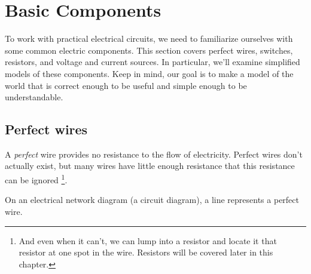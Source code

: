\chapter{Basic Components}
To work with practical electrical circuits, we need to familiarize ourselves with some common electric components. This section covers perfect wires, switches, resistors, and voltage and current sources. In particular, we'll examine simplified models of these components. Keep in mind, our goal is to make a model of the world that is correct enough to be useful and simple enough to be understandable.


\section{Perfect wires}
A \emph{perfect} wire provides no resistance to the flow of electricity. Perfect wires don't actually exist, but many wires have little enough resistance that this resistance can be ignored \footnote{And even when it can't, we can lump into a resistor and locate it that resistor at one spot in the wire. Resistors will be covered later in this chapter.}.\par
On an electrical network diagram (a circuit diagram), a line represents a perfect wire.

\begin{figure}[H]
\begin{center}
\label{F:2BL}
\end{center}
\end{figure}

